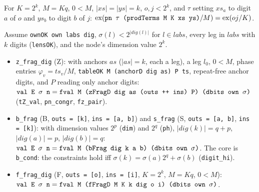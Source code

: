 \begin{theorem}
For $K=2^k$, $M=Kq$, $0<M$, $|xs|=|ys|=k$, $o,j<2^k$, and $\tau$ setting $xs_a$ to digit $a$ of $o$ and
$ys_b$ to digit $b$ of $j$:
$\operatorname{ex}(\textnormal{\texttt{pn \ensuremath{\tau} (\allowbreak{}prodTerms M K xs ys)}}/M) = \operatorname{ex}(oj/K)$.
\end{theorem}

\begin{theorem}
Assume \textnormal{\texttt{ownOK own labs dig}}, $\sigma(l)<2^{|\mathit{dig}(l)|}$ for $l\in labs$, every leg in
$labs$ with $k$ digits (\textnormal{\texttt{lensOK}}), and the node's dimension value $2^k$.
\begin{itemize}
\item \textnormal{\texttt{z\_\allowbreak{}frag\_\allowbreak{}dig}} (Z): with anchors $as$ ($|as|=k$, each a leg), a leg $l_0$, $0<M$, phase
  entries $\varphi_v = ts_v/M$, \textnormal{\texttt{tableOK M (\allowbreak{}anchorD dig as) P ts}}, repeat-free anchor digits,
  and $P$ reading only anchor digits:
  $\textnormal{\texttt{val E \ensuremath{\sigma} n}} = \textnormal{\texttt{fval M (\allowbreak{}zFragD dig as (\allowbreak{}outs ++ ins) P) (\allowbreak{}dbits own \ensuremath{\sigma})}}$
  (\textnormal{\texttt{tZ\_\allowbreak{}val}}, \textnormal{\texttt{pn\_\allowbreak{}congr}}, \textnormal{\texttt{fz\_\allowbreak{}pair}}).
\item \textnormal{\texttt{b\_\allowbreak{}frag}} (B, \textnormal{\texttt{outs = [k]}}, \textnormal{\texttt{ins = [a,\allowbreak{} b]}}) and \textnormal{\texttt{s\_\allowbreak{}frag}} (S,
  \textnormal{\texttt{outs = [a,\allowbreak{} b]}}, \textnormal{\texttt{ins = [k]}}): with dimension values $2^p$ (\textnormal{\texttt{dim}}) and $2^q$
  (\textnormal{\texttt{ph}}), $|\mathit{dig}(k)| = q+p$, $|\mathit{dig}(a)| = p$, $|\mathit{dig}(b)| = q$:
  $\textnormal{\texttt{val E \ensuremath{\sigma} n}} = \textnormal{\texttt{fval M (\allowbreak{}bFrag dig k a b) (\allowbreak{}dbits own \ensuremath{\sigma})}}$. The core is \textnormal{\texttt{b\_\allowbreak{}cond}}:
  the constraints hold iff $\sigma(k) = \sigma(a)2^q+\sigma(b)$ (\textnormal{\texttt{digit\_\allowbreak{}hi}}).
\item \textnormal{\texttt{f\_\allowbreak{}frag\_\allowbreak{}dig}} (F, \textnormal{\texttt{outs = [o]}}, \textnormal{\texttt{ins = [i]}}, $K=2^k$, $M=Kq$, $0<M$):
  $\textnormal{\texttt{val E \ensuremath{\sigma} n}} = \textnormal{\texttt{fval M (\allowbreak{}fFragD M K k dig o i) (\allowbreak{}dbits own \ensuremath{\sigma})}}$.

\end{itemize}
\end{theorem}
